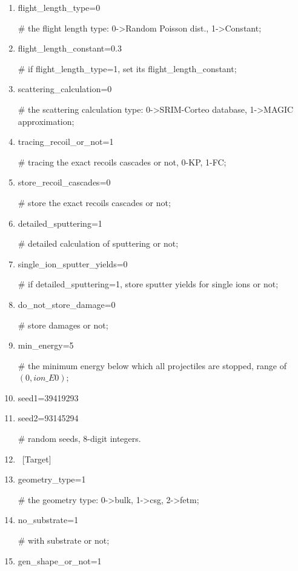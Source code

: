 \begin{enumerate}[1:~]
\item flight\_length\_type=0

\# the flight length type: 0->Random Poisson dist., 1->Constant;

\item flight\_length\_constant=0.3

\# if flight\_length\_type=1, set its flight\_length\_constant;

\item scattering\_calculation=0

\# the scattering calculation type: 0->SRIM-Corteo database, 1->MAGIC approximation;

\item tracing\_recoil\_or\_not=1

\# tracing the exact recoils cascades or not, 0-KP, 1-FC;

\item store\_recoil\_cascades=0

\# store the exact recoils cascades or not;

\item detailed\_sputtering=1

\# detailed calculation of sputtering or not;

\item single\_ion\_sputter\_yields=0

\# if detailed\_sputtering=1, store sputter yields for single ions or not;

\item do\_not\_store\_damage=0

\# store damages or not;

\item min\_energy=5

\# the minimum energy below which all projectiles are stopped, range of $(0, ion\_E0)$;

\item seed1=39419293
\item seed2=93145294

\# random seeds, 8-digit integers.

\item ~[Target]
\item geometry\_type=1

\# the geometry type: 0->bulk, 1->csg, 2->fetm;

\item no\_substrate=1

\# with substrate or not;

\item gen\_shape\_or\_not=1


\end{enumerate}
